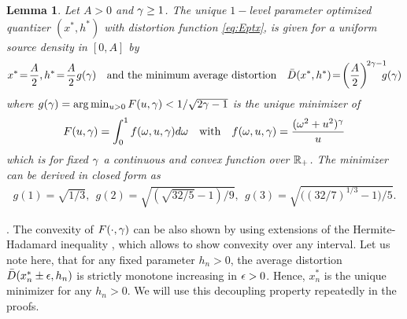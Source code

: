 \documentclass[12pt,onecolumn,journal,draftclsnofoot,letterpaper]{IEEEtran}
\newtheorem{lemma}{Lemma}
\newif\ifarxiv\arxivfalse
\newenvironment{remark}{\par\vspace{1.5ex}\noindent{\em Remark\/}.}{\par\vspace{1.5ex}}
\newcommand{\Dis}{\ensuremath{D}}                    %
\newcommand{\AvDis}{\ensuremath{\bar{\Dis}}}         %
\begin{document}
\begin{lemma}\label{lem:ggam}
  Let $A>0$ and $\gamma\geq 1$. The unique $1-$level parameter optimized quantizer $(x^*,h^*)$ with distortion
  function \eqref{eq:Eptx}, is given  for a uniform source
  density in $[0,A]$ by
  \begin{align}
    x^*\!=\!\frac{A}{2},   h^*\!=\!\frac{A}{2} g(\gam) \quad\text{and the minimum average distortion} \quad
    \AvDis(x^*,h^*)\!=\!\left(\frac{A}{2}\right)^{\!2\gam-1}\!\!\!\!g(\gam)\notag
  \end{align}
  where  $g(\gamma)=\arg\min_{u>0} F(u,\gamma)<1/\sqrt{2\gamma-1}$ is the unique minimizer of 
  \begin{align}
    F(u,\gamma)=\int_0^1  f(\omega,u,\gamma) d\omega \quad\text{with}\quad f(\omega,u,\gamma)=\frac{(\omega^2+u^2)^{\gamma}}{u} 
  \end{align}
  which is for fixed $\gamma$ a continuous and convex function over ${\mathbb R}_+$. The minimizer can be derived in closed form as 
  \begin{align}
    g(1) = \sqrt{1/3},\ \  g(2) = \sqrt{ (\sqrt{32/5}-1)/9}, 
    \ \  g(3) = \sqrt{\Big((32/7)^{1/3}-1\Big)/5}.\label{eq:ggam}
  \end{align}
\end{lemma}
%
\ifarxiv 
\begin{proof}
See \appref{app:proof_lemma_ggam}.
\end{proof}
\fi


\begin{remark}
  The convexity of $F(\cdot,\gamma)$ can be also shown by using extensions of the Hermite-Hadamard inequality \cite{ZC10},
  which allows to show convexity over any interval.
  Let us note here, that for any fixed parameter $h_n>0$, the average distortion $\AvDis(x_n^*\pm \eps,h_n)$ is strictly
  monotone increasing in $\epsilon>0$. Hence, $x_n^*$ is the unique minimizer for any $h_n>0$. We will use this decoupling
  property repeatedly in the proofs. 
\end{remark}
\end{document}
